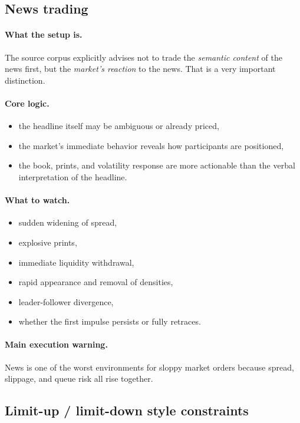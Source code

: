 \subsection{News trading}

\paragraph{What the setup is.} The source corpus explicitly advises not to trade the \emph{semantic content} of the news first, but the \emph{market's reaction} to the news. That is a very important distinction.

\paragraph{Core logic.}
\begin{itemize}
\item the headline itself may be ambiguous or already priced,
\item the market's immediate behavior reveals how participants are positioned,
\item the book, prints, and volatility response are more actionable than the verbal interpretation of the headline.
\end{itemize}

\paragraph{What to watch.}
\begin{itemize}
\item sudden widening of spread,
\item explosive prints,
\item immediate liquidity withdrawal,
\item rapid appearance and removal of densities,
\item leader-follower divergence,
\item whether the first impulse persists or fully retraces.
\end{itemize}

\paragraph{Main execution warning.} News is one of the worst environments for sloppy market orders because spread, slippage, and queue risk all rise together.

\subsection{Limit-up / limit-down style constraints}

